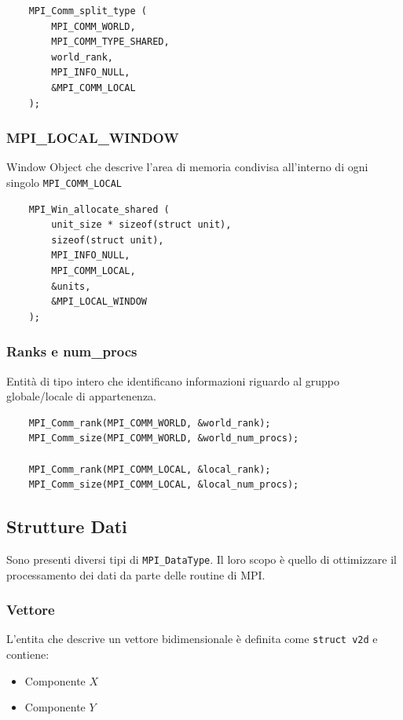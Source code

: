 \documentclass[12pt]{article}
\begin{document}
\begin{lstlisting}
    MPI_Comm_split_type (
        MPI_COMM_WORLD, 
        MPI_COMM_TYPE_SHARED, 
        world_rank, 
        MPI_INFO_NULL, 
        &MPI_COMM_LOCAL
    );
\end{lstlisting}


\subsubsection{MPI\_LOCAL\_WINDOW}
Window Object che descrive l'area di memoria condivisa all'interno di ogni singolo \verb|MPI_COMM_LOCAL|

\begin{lstlisting}
    MPI_Win_allocate_shared (
        unit_size * sizeof(struct unit), 
        sizeof(struct unit), 
        MPI_INFO_NULL, 
        MPI_COMM_LOCAL, 
        &units, 
        &MPI_LOCAL_WINDOW
    );
\end{lstlisting}


\subsubsection{Ranks e num\_procs}
Entità di tipo intero che identificano informazioni riguardo al gruppo globale/locale di appartenenza.

\begin{lstlisting}
    MPI_Comm_rank(MPI_COMM_WORLD, &world_rank);
    MPI_Comm_size(MPI_COMM_WORLD, &world_num_procs);
    
    MPI_Comm_rank(MPI_COMM_LOCAL, &local_rank);
    MPI_Comm_size(MPI_COMM_LOCAL, &local_num_procs);
\end{lstlisting}


\subsection{Strutture Dati}
Sono presenti diversi tipi di \verb|MPI_DataType|. Il loro scopo è quello di ottimizzare il processamento dei dati da parte delle routine di MPI.



\subsubsection{Vettore}
L'entita che descrive un vettore bidimensionale è definita come \verb|struct v2d| e contiene:
\begin{itemize}
    \item Componente \(X\)
    \item Componente \(Y\)
\end{itemize}
\end{document}
